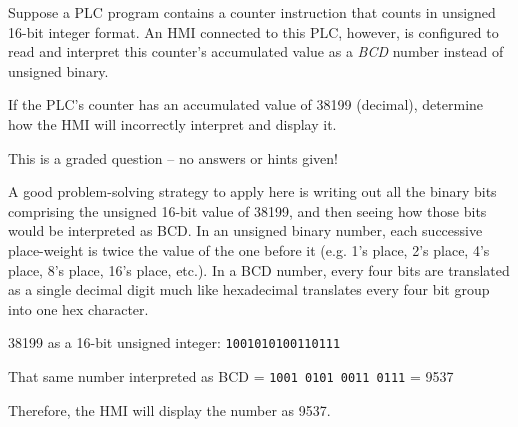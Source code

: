 

Suppose a PLC program contains a counter instruction that counts in unsigned 16-bit integer format.  An HMI connected to this PLC, however, is configured to read and interpret this counter's accumulated value as a {\it BCD} number instead of unsigned binary.

\vskip 10pt

If the PLC's counter has an accumulated value of 38199 (decimal), determine how the HMI will incorrectly interpret and display it.

\vfil
{}
\eject






This is a graded question -- no answers or hints given!







A good problem-solving strategy to apply here is writing out all the binary bits comprising the unsigned 16-bit value of 38199, and then seeing how those bits would be interpreted as BCD.  In an unsigned binary number, each successive place-weight is twice the value of the one before it (e.g. 1's place, 2's place, 4's place, 8's place, 16's place, etc.).  In a BCD number, every four bits are translated as a single decimal digit much like hexadecimal translates every four bit group into one hex character.

\vskip 10pt

38199 as a 16-bit unsigned integer: {\tt 1001010100110111}

That same number interpreted as BCD = {\tt 1001 0101 0011 0111} = 9537

\vskip 10pt

Therefore, the HMI will display the number as 9537.




